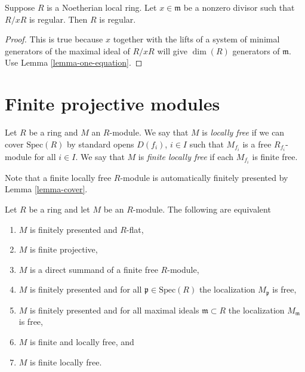 \begin{lemma}
\label{lemma-regular-mod-x}
Suppose $R$ is a Noetherian local ring.
Let $x \in \mathfrak m$ be a nonzero divisor
such that $R/xR$ is regular. Then $R$ is regular.
\end{lemma}

\begin{proof}
This is true because $x$ together with the lifts of a system
of minimal generators of the maximal ideal of $R/xR$ will give
$\dim(R)$ generators of $\mathfrak m$.
Use Lemma \ref{lemma-one-equation}.
\end{proof}








\section{Finite projective modules}
\label{section-finite-projective-modules}

\begin{definition}
\label{definition-locally-free}
Let $R$ be a ring and $M$ an $R$-module.
We say that $M$ is {\it locally free} if
we can cover $\text{Spec}(R)$ by standard
opens $D(f_i)$, $i \in I$ such that $M_{f_i}$
is a free $R_{f_i}$-module for all $i \in I$.
We say that $M$ is {\it finite locally free} if
each $M_{f_i}$ is finite free.
\end{definition}

\noindent
Note that a finite locally free $R$-module is
automatically finitely presented by Lemma \ref{lemma-cover}.

\begin{lemma}
\label{lemma-finite-projective}
Let $R$ be a ring and let $M$ be an $R$-module.
The following are equivalent
\begin{enumerate}
\item $M$ is finitely presented and $R$-flat,
\item $M$ is finite projective,
\item $M$ is a direct summand of a finite free $R$-module,
\item $M$ is finitely presented and
for all $\mathfrak p \in \text{Spec}(R)$ the
localization $M_{\mathfrak p}$ is free,
\item $M$ is finitely presented and
for all maximal ideals $\mathfrak m \subset R$ the
localization $M_{\mathfrak m}$ is free,
\item $M$ is finite and locally free, and
\item $M$ is finite locally free.
\end{enumerate}
\end{lemma}


